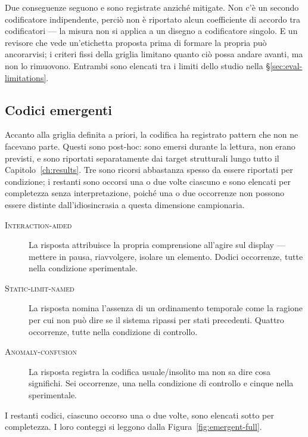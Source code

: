 Due conseguenze seguono e sono registrate anziché mitigate. Non c'è un secondo codificatore
indipendente, perciò non è riportato alcun coefficiente di accordo tra codificatori --- la misura non
si applica a un disegno a codificatore singolo. E un revisore che vede un'etichetta proposta prima di
formare la propria può ancorarvisi; i criteri fissi della griglia limitano quanto ciò possa andare
avanti, ma non lo rimuovono. Entrambi sono elencati tra i limiti dello studio nella
\S\ref{sec:eval-limitations}.

\subsection{Codici emergenti}
\label{subsec:app-emergent}

Accanto alla griglia definita a priori, la codifica ha registrato pattern che non ne facevano parte.
Questi sono post-hoc: sono emersi durante la lettura, non erano previsti, e sono riportati
separatamente dai target strutturali lungo tutto il Capitolo~\ref{ch:results}. Tre sono ricorsi
abbastanza spesso da essere riportati per condizione; i restanti sono occorsi una o due volte
ciascuno e sono elencati per completezza senza interpretazione, poiché una o due occorrenze non
possono essere distinte dall'idiosincrasia a questa dimensione campionaria.

\begin{description}
\item[\textnormal{\textsc{Interaction-aided}}] La risposta attribuisce la propria comprensione
all'agire sul display --- mettere in pausa, riavvolgere, isolare un elemento. Dodici occorrenze,
tutte nella condizione sperimentale.

\item[\textnormal{\textsc{Static-limit-named}}] La risposta nomina l'assenza di un ordinamento
temporale come la ragione per cui non può dire se il sistema ripassi per stati precedenti. Quattro
occorrenze, tutte nella condizione di controllo.

\item[\textnormal{\textsc{Anomaly-confusion}}] La risposta registra la codifica usuale/insolito ma
non sa dire cosa significhi. Sei occorrenze, una nella condizione di controllo e cinque nella
sperimentale.
\end{description}

I restanti codici, ciascuno occorso una o due volte, sono elencati sotto per completezza. I loro
conteggi si leggono dalla Figura~\ref{fig:emergent-full}.

